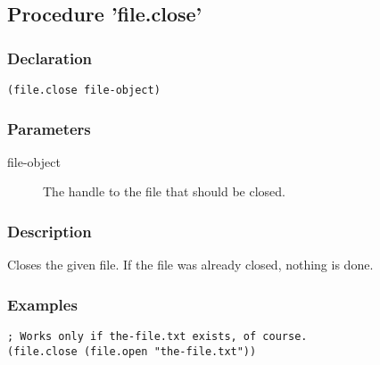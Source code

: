 \subsection{Procedure 'file.close'}
\label{builtins/file.close}

\subsubsection*{Declaration}
\begin{lstlisting}
(file.close file-object)
\end{lstlisting}

\subsubsection*{Parameters}
\begin{description}
	\item[file-object] The handle to the file that should be closed.
\end{description}

\subsubsection*{Description}
Closes the given file. If the file was already closed, nothing is done.

\subsubsection*{Examples}
\begin{lstlisting}
; Works only if the-file.txt exists, of course.
(file.close (file.open "the-file.txt"))
\end{lstlisting}
